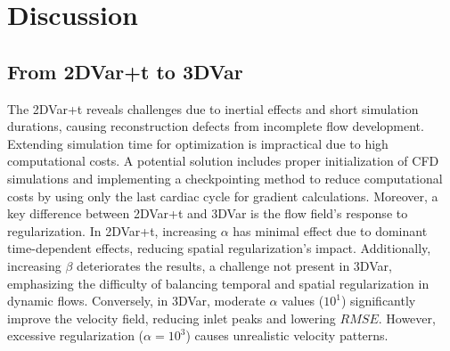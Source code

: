 \section*{Discussion}
%
\subsection*{From 2DVar+t to 3DVar}
The 2DVar+t reveals challenges due to inertial effects and short simulation durations, causing reconstruction defects from incomplete flow development. Extending simulation time for optimization is impractical due to high computational costs. A potential solution includes proper initialization of CFD simulations and implementing a checkpointing method to reduce computational costs by using only the last cardiac cycle for gradient calculations.
Moreover, a key difference between 2DVar+t and 3DVar is the flow field's response to regularization. In 2DVar+t, increasing $\alpha$ has minimal effect due to dominant time-dependent effects, reducing spatial regularization's impact. Additionally, increasing $\beta$ deteriorates the results, a challenge not present in 3DVar, emphasizing the difficulty of balancing temporal and spatial regularization in dynamic flows. Conversely, in 3DVar, moderate $\alpha$ values ($10^{1}$) significantly improve the velocity field, reducing inlet peaks and lowering \(RMSE\). However, excessive regularization ($\alpha = 10^{3}$) causes unrealistic velocity patterns. 

